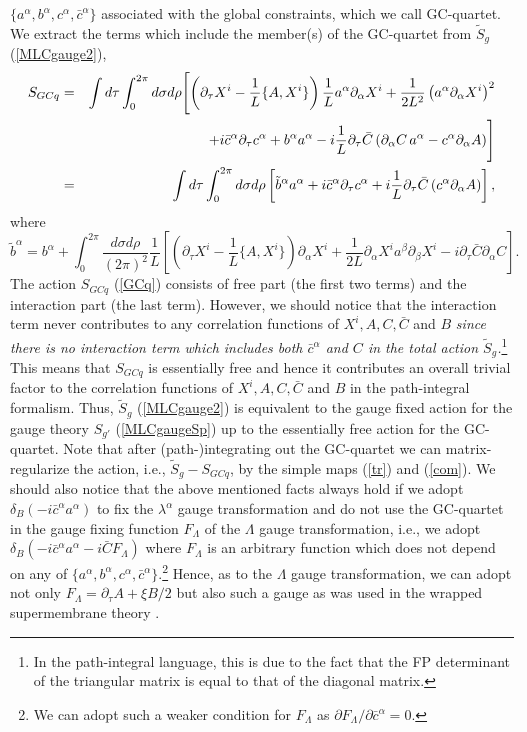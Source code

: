\documentclass[12pt,a4paper]{article}
\newcommand{\nn}{\nonumber\\}
\newcommand{\ptau}{\partial_\tau}
\newcommand{\brs}{\delta_B}
\newcommand{\p}{\partial}
\begin{document}
$\{a^\alpha,b^\alpha,c^\alpha,\bar{c}^\alpha\}$ associated
with the global constraints, which we call GC-quartet.
We extract the terms which include the member(s) of the GC-quartet
from $\tilde{S}_g$ (\ref{MLCgauge2}),
\begin{eqnarray}
  S_{GCq}&=&\int d\tau \int_0^{2\pi}d\sigma d\rho\Biggl[
    \left(\ptau X^i -\frac{1}{L}\{A,X^i\}\right)
	\frac{1}{L}a^\alpha \p_\alpha X^i
    + \frac{1}{2L^2}\left(a^\alpha \p_\alpha X^i\right)^2\nn
   && \hspace{17ex}  +i\bar{c}^{\alpha}\ptau c^{\alpha}
   +b^{\alpha}a^{\alpha} - i\frac{1}{L}\ptau\bar{C}\left(
    \p_{\alpha}C\,a^{\alpha}-c^{\alpha}\p_{\alpha}A\right)\Biggr]\nn
  &=&\int d\tau \int_0^{2\pi}d\sigma d\rho\left[
    \tilde{b}^\alpha a^\alpha + i\bar{c}^{\alpha}\ptau c^{\alpha}
    +i\frac{1}{L}\ptau\bar{C}\left(c^{\alpha}\p_{\alpha}A\right)\right],
    \label{GCq}
\end{eqnarray}
where
\begin{equation}
  \tilde{b}^\alpha=b^\alpha + \int^{2\pi}_0
    \frac{d\sigma d\rho}{(2\pi)^2} \frac{1}{L}\left[
    \left(\ptau X^i-\frac{1}{L}\{A,X^i\}\right)\p_\alpha X^i
    +\frac{1}{2L}\p_\alpha X^i a^\beta\p_\beta X^i
	- i\ptau\bar{C}\p_\alpha C\right].
\end{equation}
The action $S_{GCq}$ (\ref{GCq}) consists of free part (the first two
terms) and the interaction part (the last term). However, we should
notice that the interaction term never contributes to any correlation
functions of $X^i, A, C, \bar{C}$ and $B$ {\it since there is no
interaction term which includes both $\bar{c}^\alpha$ and $C$ in the
total action $\tilde{S}_g$.}\footnote{In the path-integral language,
this is due to the fact that the FP determinant of the triangular
matrix is equal to that of the diagonal matrix.}
This means that  $S_{GCq}$ is essentially free and hence it
contributes an overall trivial factor to the correlation functions
of $X^i, A, C, \bar{C}$ and $B$ in the path-integral formalism.
Thus, $\tilde{S}_g$ (\ref{MLCgauge2}) is equivalent to the gauge fixed
action  for the gauge theory $S_{g'}$ (\ref{MLCgaugeSp}) up to the
essentially free action for the GC-quartet.
Note that after (path-)integrating out the GC-quartet we can
matrix-regularize the action, i.e., $\tilde{S}_g-S_{GCq}$, by the
simple maps (\ref{tr}) and (\ref{com}).
We should also notice that the above mentioned facts always hold
if we adopt $\brs(-i\bar{c}^\alpha a^{\alpha})$ to fix the
$\lambda^{\alpha}$ gauge transformation and do not use the GC-quartet
in the gauge fixing function $F_\Lambda$ of the $\Lambda$ gauge
transformation, i.e., we adopt
$\brs{(-i\bar{c}^\alpha a^{\alpha}-i\bar{C}F_\Lambda)}$ where
$F_\Lambda$ is an arbitrary function which does not depend on any of
$\{a^\alpha,b^\alpha,c^\alpha,\bar{c}^\alpha\}$.\footnote{
We can adopt such a weaker condition for $F_\Lambda$ as $\p
F_\Lambda/\p\bar{c}^\alpha=0$.}
Hence, as to the $\Lambda$ gauge transformation, we can adopt not only
$F_\Lambda=\ptau A +\xi B/2$ but also such a gauge as was
used in the wrapped supermembrane theory \cite{SY,UY}.
 
\end{document}
